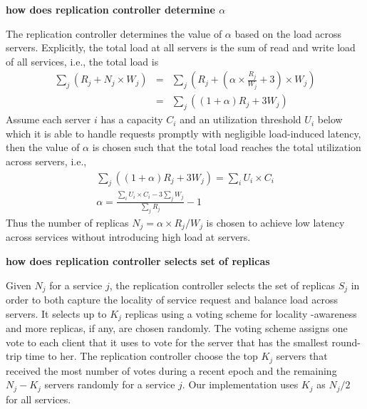 {{{\bf how does replication controller determine $\alpha$}

The replication controller determines the value of $\alpha$ based on the load across servers. Explicitly, the total load at all servers is the sum of read and write load of all services, i.e., the total load is
\begin{eqnarray}
\sum_j (R_j + N_j \times W_j) & = & \sum_j (R_j + (\alpha \times \frac{R_j}{W_j} + 3) \times W_j)\nonumber \\ 
& = & \sum_j ((1 + \alpha)R_j + 3W_j)
\end{eqnarray}
Assume each server $i$ has a capacity $C_i$ and an utilization threshold $U_i$ below which it is able to handle requests promptly with negligible load-induced latency, then the value of $\alpha$ is chosen such that the total load reaches the total utilization across servers, i.e., 
\begin{eqnarray}
 \sum_j ( (1 + \alpha) R_j + 3W_j) = \sum_i U_i \times C_i \nonumber \\
\alpha  =   \frac{\sum_i U_i \times C_i - 3\sum_jW_j}{\sum_j R_j} - 1 
\end{eqnarray}
Thus the number of replicas $N_j = \alpha \times R_j/W_j$ is chosen to achieve low latency across services without introducing high load at servers.

%

{\bf how does replication controller selects set of replicas}

Given $N_j$ for a service $j$, the replication controller selects the set of replicas $S_j$ in order to both capture the locality of service request and balance load across servers. It selects up to $K_j$ replicas using a voting scheme for locality
-awareness and more replicas, if any, are chosen randomly. The voting scheme assigns one vote to each client that it uses to vote for the server that has the smallest round-trip time to her. The replication controller choose the top $K_j$ servers that received the most number of votes during a recent epoch and the remaining $N_j - K_j$ servers randomly for a service $j$. Our implementation uses $K_j$ as $N_j/2$ for all services.

}}

